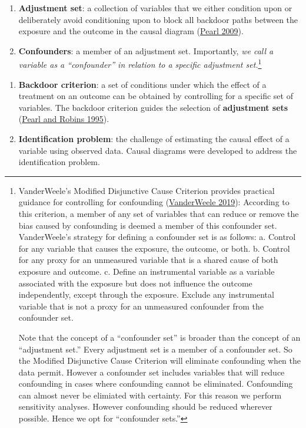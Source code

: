 \documentclass[
  singlecolumn]{article}
\begin{document}
\begin{enumerate}
\def\labelenumi{\arabic{enumi}.}
\setcounter{enumi}{5}
\item
  \textbf{Adjustment set}: a collection of variables that we either
  condition upon or deliberately avoid conditioning upon to block all
  backdoor paths between the exposure and the outcome in the causal
  diagram (\protect\hyperlink{ref-pearl2009}{Pearl 2009}).
\item
  \textbf{Confounders}: a member of an adjustment set. Importantly,
  \emph{we call a variable as a ``confounder'' in relation to a specific
  adjustment set.}\footnote{VanderWeele's Modified Disjunctive Cause
    Criterion provides practical guidance for controlling for
    confounding (\protect\hyperlink{ref-vanderweele2019}{VanderWeele
    2019}): According to this criterion, a member of any set of
    variables that can reduce or remove the bias caused by confounding
    is deemed a member of this confounder set. VanderWeele's strategy
    for defining a confounder set is as follows: a. Control for any
    variable that causes the exposure, the outcome, or both. b. Control
    for any proxy for an unmeasured variable that is a shared cause of
    both exposure and outcome. c. Define an instrumental variable as a
    variable associated with the exposure but does not influence the
    outcome independently, except through the exposure. Exclude any
    instrumental variable that is not a proxy for an unmeasured
    confounder from the confounder set.

    Note that the concept of a ``confounder set'' is broader than the
    concept of an ``adjustment set.'' Every adjustment set is a member
    of a confounder set. So the Modified Disjunctive Cause Criterion
    will eliminate confounding when the data permit. However a
    confounder set includes variables that will reduce confounding in
    cases where confounding cannot be eliminated. Confounding can almost
    never be elimiated with certainty. For this reason we perform
    sensitivity analyses. However confounding should be reduced wherever
    possible. Hence we opt for ``confounder sets.''}
\end{enumerate}

\begin{enumerate}
\def\labelenumi{\arabic{enumi}.}
\setcounter{enumi}{7}
\item
  \textbf{Backdoor criterion}: a set of conditions under which the
  effect of a treatment on an outcome can be obtained by controlling for
  a specific set of variables. The backdoor criterion guides the
  selection of \textbf{adjustment sets}
  (\protect\hyperlink{ref-pearl1995}{Pearl and Robins 1995}).
\item
  \textbf{Identification problem}: the challenge of estimating the
  causal effect of a variable using observed data. Causal diagrams were
  developed to address the identification problem.
\end{enumerate}
\end{document}
